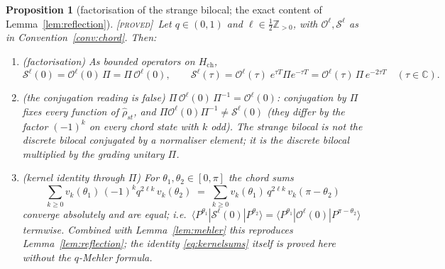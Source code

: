 \documentclass[11pt,a4paper]{article}
\newcommand{\PROVED}{{\color{ForestGreen}\textsc{[proved]}}}
\theoremstyle{definition}
\theoremstyle{plain}
\newtheorem{proposition}[definition]{Proposition}
\newcommand{\Z}{\mathbb{Z}}
\newcommand{\C}{\mathbb{C}}
\newcommand{\ket}[1]{|#1\rangle}
\newcommand{\bra}[1]{\langle #1|}
\renewcommand{\P}{P}                            %
\renewcommand{\O}{\mathcal{O}}                  %
\begin{document}
\begin{proposition}[factorisation of the strange bilocal; the exact content of
Lemma~\ref{lem:reflection}]\label{prop:factorisation}
\PROVED\ Let $q\in(0,1)$ and $\ell\in\tfrac12\Z_{>0}$, with
$\O^{\ell},\mathcal{S}^{\ell}$ as in Convention~\ref{conv:chord}. Then:
\begin{enumerate}[label=(\alph*)]
\item \emph{(factorisation)} As bounded operators on $H_{\mathrm{ch}}$,
\begin{equation}\label{eq:factorisation}
  \mathcal{S}^{\ell}(0)=\O^{\ell}(0)\,\Pi=\Pi\,\O^{\ell}(0),
  \qquad
  \mathcal{S}^{\ell}(\tau)=\O^{\ell}(\tau)\;e^{\tau T}\Pi e^{-\tau T}
  =\O^{\ell}(\tau)\,\Pi\,e^{-2\tau T}\quad(\tau\in\C).
\end{equation}
\item \emph{(the conjugation reading is false)} $\Pi\,\O^{\ell}(0)\,\Pi^{-1}=\O^{\ell}(0)$:
conjugation by $\Pi$ fixes every function of $\hat\rho_{st}$, and
$\Pi\O^{\ell}(0)\Pi^{-1}\neq\mathcal{S}^{\ell}(0)$ (they differ by the factor $(-1)^{k}$ on
every chord state with $k$ odd). The strange bilocal is \emph{not} the discrete bilocal
conjugated by a normaliser element; it is the discrete bilocal \emph{multiplied} by the
grading unitary $\Pi$.
\item \emph{(kernel identity through $\Pi$)} For $\theta_{1},\theta_{2}\in[0,\pi]$ the chord
sums
\begin{equation}\label{eq:kernelsums}
  \sum_{k\ge0}v_{k}(\theta_{1})\,(-1)^{k}q^{2\ell k}\,v_{k}(\theta_{2})
  \;=\;\sum_{k\ge0}v_{k}(\theta_{1})\,q^{2\ell k}\,v_{k}(\pi-\theta_{2})
\end{equation}
converge absolutely and are equal; i.e.\
$\bra{\P^{\theta_1}}\mathcal{S}^{\ell}(0)\ket{\P^{\theta_2}}
=\bra{\P^{\theta_1}}\O^{\ell}(0)\ket{\P^{\pi-\theta_2}}$ termwise. Combined with
Lemma~\ref{lem:mehler} this reproduces Lemma~\ref{lem:reflection}; the identity
\eqref{eq:kernelsums} itself is proved here without the $q$-Mehler formula.
\end{enumerate}
\end{proposition}
\end{document}
